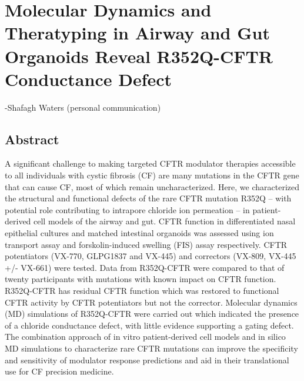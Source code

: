 \chapter{Molecular Dynamics and Theratyping in Airway and Gut Organoids Reveal R352Q-CFTR Conductance Defect}
\setcounter{figure}{0}
\renewcommand{\thefigure}{\arabic{chapter}.\arabic{figure}}
\label{chap:R352Q}
 {-Shafagh Waters (personal communication)}

\section*{\centering Abstract} 
A significant challenge to making targeted CFTR modulator therapies accessible to all individuals with cystic fibrosis (CF) are many mutations in the CFTR gene that can cause CF, most of which remain uncharacterized. Here, we characterized the structural and functional defects of the rare CFTR mutation R352Q – with potential role contributing to intrapore chloride ion permeation – in patient-derived cell models of the airway and gut. CFTR function in differentiated nasal epithelial cultures and matched intestinal organoids was assessed using ion transport assay and forskolin-induced swelling (FIS) assay respectively. CFTR potentiators (VX-770, GLPG1837 and VX-445) and correctors (VX-809, VX-445 +/- VX-661) were tested.  Data from R352Q-CFTR were compared to that of twenty participants with mutations with known impact on CFTR function. R352Q-CFTR has residual CFTR function which was restored to functional CFTR activity by CFTR potentiators but not the corrector. Molecular dynamics (MD) simulations of R352Q-CFTR were carried out which indicated the presence of a chloride conductance defect, with little evidence supporting a gating defect. The combination approach of in vitro patient-derived cell models and in silico MD simulations to characterize rare CFTR mutations can improve the specificity and sensitivity of modulator response predictions and aid in their translational use for CF precision medicine.


\smallskip


